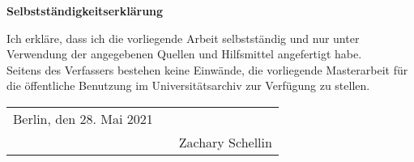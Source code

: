 \begin{center}
{\sffamily \bfseries\Large Selbstständigkeitserklärung}\\
\end{center}%
\vspace{1cm}
%
Ich erkläre, dass ich die vorliegende Arbeit selbstständig und nur unter Verwendung der angegebenen Quellen und Hilfsmittel angefertigt habe.\\[0.2cm]
\noindent Seitens des Verfassers bestehen keine Einwände, die vorliegende Masterarbeit für die öffentliche Benutzung im Universitätsarchiv zur Verfügung zu stellen.\\[2cm]

\hspace{-1cm}
\begin{tabular}{p{5.5cm}p{2.5cm}c}
Berlin, den 28. Mai 2021   && \hrulefill\\%
     && \hspace{1cm}Zachary Schellin \hspace{1cm}
\end{tabular} 